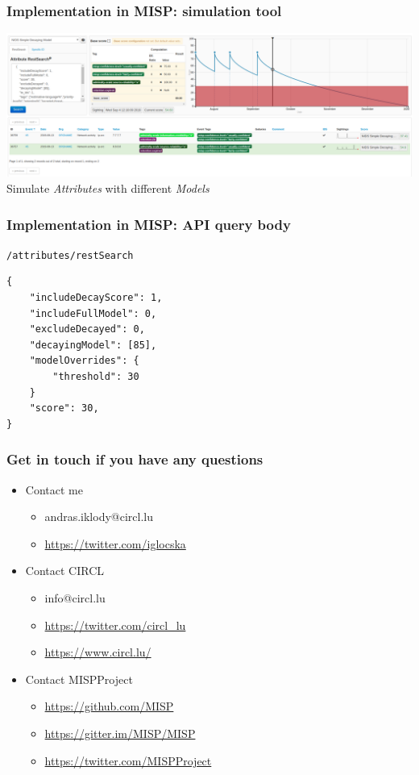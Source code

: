 \begin{frame}
    \frametitle{Implementation in MISP: simulation tool}
    \includegraphics[width=1.00\linewidth]{decaying-simulation.png}
    Simulate \textit{Attributes} with different \textit{Models}
\end{frame}

\begin{frame}[fragile]
    \frametitle{Implementation in MISP: API query body}
    \texttt{/attributes/restSearch}
    \begin{lstlisting}
{
    "includeDecayScore": 1,
    "includeFullModel": 0,
    "excludeDecayed": 0,
    "decayingModel": [85],
    "modelOverrides": {
        "threshold": 30
    }
    "score": 30,
}
    \end{lstlisting}
\end{frame}

\begin{frame}
  \frametitle{Get in touch if you have any questions}
  \begin{itemize}
    \item Contact me
    \begin{itemize}
      \item andras.iklody@circl.lu
      \item \url{https://twitter.com/iglocska}
    \end{itemize}
    \item Contact CIRCL
    \begin{itemize}
      \item info@circl.lu
      \item \url{https://twitter.com/circl_lu}
      \item \url{https://www.circl.lu/}
    \end{itemize}
    \item Contact MISPProject 
    \begin{itemize}
      \item \url{https://github.com/MISP}
      \item \url{https://gitter.im/MISP/MISP}
      \item \url{https://twitter.com/MISPProject}
    \end{itemize}
  \end{itemize}
\end{frame}
